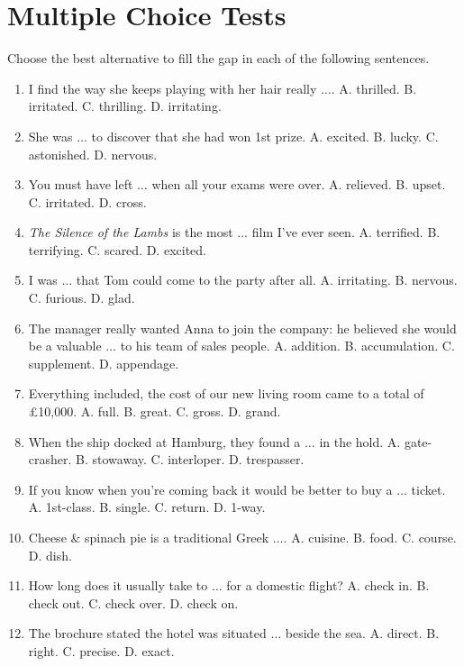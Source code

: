 \documentclass{article}
\numberwithin{equation}{section}
\begin{document}
\section{Multiple Choice Tests}
Choose the best alternative to fill the gap in each of the following sentences.
\begin{enumerate}[leftmargin=8mm]
	\item I find the way she keeps playing with her hair really $\ldots$. {\sf A.} thrilled. {\sf B.} irritated. {\sf C.} thrilling. {\sf D.} irritating.
	\item She was $\ldots$ to discover that she had won 1st prize. {\sf A.} excited. {\sf B.} lucky. {\sf C.} astonished. {\sf D.} nervous.
	\item You must have left $\ldots$ when all your exams were over. {\sf A.} relieved. {\sf B.} upset. {\sf C.} irritated. {\sf D.} cross.
	\item \textit{The Silence of the Lambs} is the most $\ldots$ film I've ever seen. {\sf A.} terrified. {\sf B.} terrifying. {\sf C.} scared. {\sf D.} excited.
	\item I was $\ldots$ that Tom could come to the party after all. {\sf A.} irritating. {\sf B.} nervous. {\sf C.} furious. {\sf D.} glad.
	\item The manager really wanted Anna to join the company: he believed she would be a valuable $\ldots$ to his team of sales people. {\sf A.} addition. {\sf B.} accumulation. {\sf C.} supplement. {\sf D.} appendage.
	\item Everything included, the cost of our new living room came to a total of \pounds10,000. {\sf A.} full. {\sf B.} great. {\sf C.} gross. {\sf D.} grand.
	\item When the ship docked at Hamburg, they found a $\ldots$ in the hold. {\sf A.} gate-crasher. {\sf B.} stowaway. {\sf C.} interloper. {\sf D.} trespasser.
	\item If you know when you're coming back it would be better to buy a $\ldots$ ticket. {\sf A.} 1st-class. {\sf B.} single. {\sf C.} return. {\sf D.} 1-way.
	\item Cheese \& spinach pie is a traditional Greek $\ldots$. {\sf A.} cuisine. {\sf B.} food. {\sf C.} course. {\sf D.} dish.
	\item How long does it usually take to $\ldots$ for a domestic flight? {\sf A.} check in. {\sf B.} check out. {\sf C.} check over. {\sf D.} check on.
	\item The brochure stated the hotel was situated $\ldots$ beside the sea. {\sf A.} direct. {\sf B.} right. {\sf C.} precise. {\sf D.} exact.

\end{enumerate}
\end{document}
